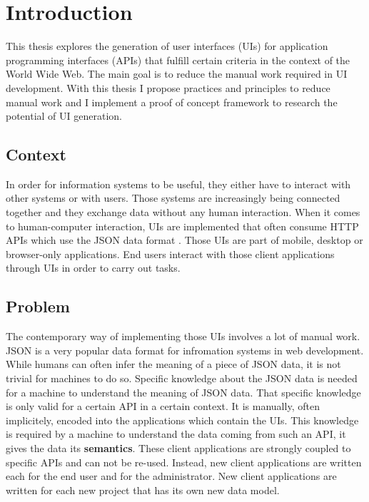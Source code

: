 \section{Introduction}\label{introduction}

This thesis explores the generation of user interfaces (UIs) for application programming interfaces (APIs) that fulfill certain criteria in the context of the World Wide Web. The main goal is to reduce the manual work required in UI development. With this thesis I propose practices and principles to reduce manual work and I implement a proof of concept framework to research the potential of UI generation.

\subsection{Context}\label{context}
In order for information systems to be useful, they either have to interact with other systems or with users. Those systems are increasingly being connected together and they exchange data without any human interaction. When it comes to human-computer interaction, UIs are implemented that often consume HTTP APIs which use the JSON data format \citep{jsonformat}. Those UIs are part of mobile, desktop or browser-only applications. End users interact with those client applications through UIs in order to carry out tasks.

\subsection{Problem}\label{problem}
The contemporary way of implementing those UIs involves a lot of manual work. JSON is a very popular data format for infromation systems in web development. While humans can often infer the meaning of a piece of JSON data, it is not trivial for machines to do so. Specific knowledge about the JSON data is needed for a machine to understand the meaning of JSON data. That specific knowledge is only valid for a certain API in a certain context. It is manually, often implicitely, encoded into the applications which contain the UIs. This knowledge is required by a machine to understand the data coming from such an API, it gives the data its \textbf{semantics}. These client applications are strongly coupled to specific APIs and can not be re-used. Instead, new client applications are written each for the end user and for the administrator. New client applications are written for each new project that has its own new data model.

